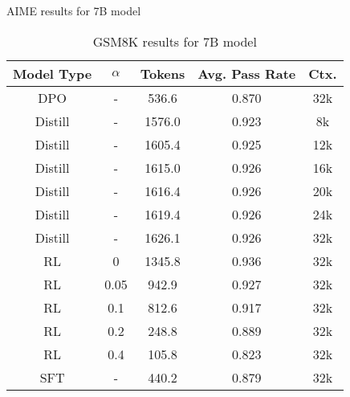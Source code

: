 \begin{center}
\begin{table}
\caption{AIME results for 7B model}
\label{table:AIME_7B}

\vspace{2.5em}

\begin{tabular}{ccccc}
\hline
\textbf{Model Type} & \textbf{$\alpha$} & \textbf{Tokens} & \textbf{Avg. Pass Rate} & \textbf{Ctx.} \\ \hline
DPO & - & 536.6 & 0.870 & 32k \\
Distill & - & 1576.0 & 0.923 & 8k \\
Distill & - & 1605.4 & 0.925 & 12k \\
Distill & - & 1615.0 & 0.926 & 16k \\
Distill & - & 1616.4 & 0.926 & 20k \\
Distill & - & 1619.4 & 0.926 & 24k \\
Distill & - & 1626.1 & 0.926 & 32k \\
RL & 0 & 1345.8 & 0.936 & 32k \\
RL & 0.05 & 942.9 & 0.927 & 32k \\
RL & 0.1 & 812.6 & 0.917 & 32k \\
RL & 0.2 & 248.8 & 0.889 & 32k \\
RL & 0.4 & 105.8 & 0.823 & 32k \\
SFT & - & 440.2 & 0.879 & 32k\\
\hline
\end{tabular}


\caption{GSM8K results for 7B model}
\label{table:GSM8K_7B}

\end{table}
\end{center}